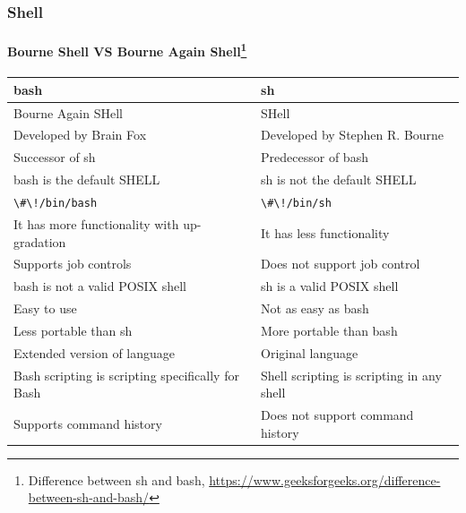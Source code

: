 \documentclass{beamer}
\begin{document}
    \begin{frame}
        \transdissolve
        \frametitle{Shell}
        \framesubtitle{Bourne Shell VS Bourne Again Shell\footnote{Difference between sh and bash, \url{https://www.geeksforgeeks.org/difference-between-sh-and-bash/}}}
        \begin{footnotesize}
            \begin{table}[h!]
                \centering
                \begin{tabular}{|p{5.5cm}|p{5.5cm}|}
                    \hline
                    \textbf{bash}                                     & \textbf{sh}                               \\ \hline
                    Bourne Again SHell                                & SHell                                     \\ \hline
                    Developed by Brain Fox                            & Developed by Stephen R. Bourne            \\ \hline
                    Successor of sh                                   & Predecessor of bash                       \\ \hline
                    bash is the default SHELL                         & sh is not the default SHELL               \\ \hline
                    \lstinline{\#\!/bin/bash}                         & \lstinline{\#\!/bin/sh}                   \\ \hline
                    It has more functionality with up-gradation       & It has less functionality                 \\ \hline
                    Supports job controls                             & Does not support job control              \\ \hline
                    bash is not a valid POSIX shell                   & sh is a valid POSIX shell                 \\ \hline
                    Easy to use                                       & Not as easy as bash                       \\ \hline
                    Less portable than sh                             & More portable than bash                   \\ \hline
                    Extended version of language                      & Original language                         \\ \hline
                    Bash scripting is scripting specifically for Bash & Shell scripting is scripting in any shell \\ \hline
                    Supports command history                          & Does not support command history          \\ \hline
                \end{tabular}
            \end{table}
        \end{footnotesize}
    \end{frame}
\end{document}
